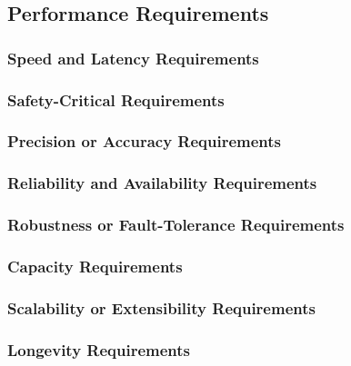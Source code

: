 \documentclass{article}
\begin{document}
\subsection{Performance Requirements}
\subsubsection{Speed and Latency Requirements}
\subsubsection{Safety-Critical Requirements}
\subsubsection{Precision or Accuracy Requirements}
\subsubsection{Reliability and Availability Requirements}
\subsubsection{Robustness or Fault-Tolerance Requirements}
\subsubsection{Capacity Requirements}
\subsubsection{Scalability or Extensibility Requirements}
\subsubsection{Longevity Requirements}




\end{document}
